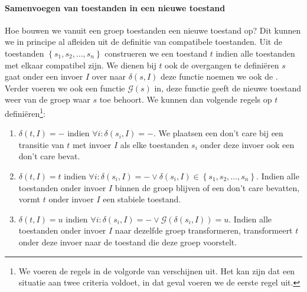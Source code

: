 \paragraph{Samenvoegen van toestanden in een nieuwe toestand}
Hoe bouwen we vanuit een groep toestanden een nieuwe toestand op? Dit kunnen we in principe al afleiden uit de definitie van compatibele toestanden. Uit de toestanden $\left\{s_1,s_2,\ldots,s_n\right\}$ construeren we een toestand $t$ indien alle toestanden met elkaar compatibel zijn. We dienen bij $t$ ook de overgangen te defini\"eren $s$ gaat onder een invoer $I$ over naar $\delta\left(s,I\right)$ deze functie noemen we ook de . Verder voeren we ook een functie $\mathcal{G}\left(s\right)$ in, deze functie geeft de nieuwe toestand weer van de groep waar $s$ toe behoort. We kunnen dan volgende regels op $t$ defini\"eren\footnote{We voeren de regels in de volgorde van verschijnen uit. Het kan zijn dat een situatie aan twee criteria voldoet, in dat geval voeren we de eerste regel uit.}:
\begin{enumerate}
 \item $\delta\left(t,I\right)=-$ indien $\forall i:\delta\left(s_i,I\right)=-$. We plaatsen een don't care bij een transitie van $t$ met invoer $I$ als elke toestanden $s_i$ onder deze invoer ook een don't care bevat.
 \item $\delta\left(t,I\right)=t$ indien $\forall i:\delta\left(s_i,I\right)=-\vee\delta\left(s_i,I\right)\in\left\{s_1,s_2,\ldots,s_n\right\}$. Indien alle toestanden onder invoer $I$ binnen de groep blijven of een don't care bevatten, vormt $t$ onder invoer $I$ een stabiele toestand.
 \item $\delta\left(t,I\right)=u$ indien $\forall i:\delta\left(s_i,I\right)=-\vee\mathcal{G}\left(\delta\left(s_i,I\right)\right)=u$. Indien alle toestanden onder invoer $I$ naar dezelfde groep transformeren, transformeert $t$ onder deze invoer naar de toestand die deze groep voorstelt.
\end{enumerate}
